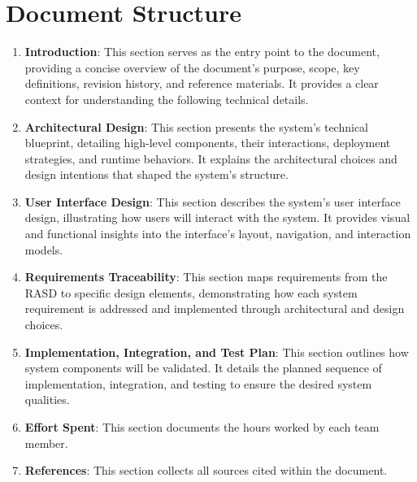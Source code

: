 \section{Document Structure}
\label{sec:document-structure}%

\begin{enumerate}
      \item \textbf{Introduction}: This section serves as the entry point to the document, providing a concise overview
            of the document's purpose, scope, key definitions, revision history, and reference materials. It provides a
            clear context for understanding the following technical details.
      \item \textbf{Architectural Design}: This section presents the system's technical blueprint, detailing high-level
            components, their interactions, deployment strategies, and runtime behaviors. It explains the architectural
            choices and design intentions that shaped the system's structure.
      \item \textbf{User Interface Design}: This section describes the system's user interface design, illustrating how
            users will interact with the system. It provides visual and functional insights into the interface's layout,
            navigation, and interaction models.
      \item \textbf{Requirements Traceability}: This section maps requirements from the RASD to specific design elements,
            demonstrating how each system requirement is addressed and implemented through architectural and design
            choices.
            \pagebreak
      \item \textbf{Implementation, Integration, and Test Plan}: This section outlines how system components will be
            validated. It details the planned sequence of implementation, integration, and testing to ensure the desired
            system qualities.
      \item \textbf{Effort Spent}: This section documents the hours worked by each team member.
      \item \textbf{References}: This section collects all sources cited within the document.
\end{enumerate}
